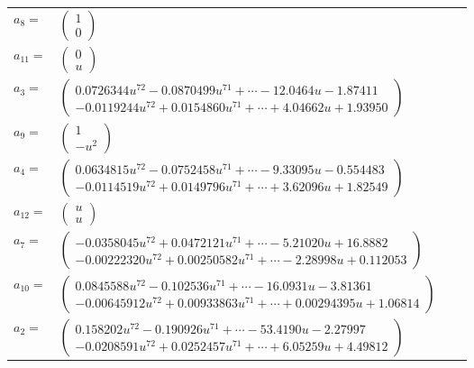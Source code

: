 \documentclass[1p]{elsarticle_modified}
\theoremstyle{definition}
\begin{document}
\begin{tabular}{m{7pt} m{180pt} m{7pt} m{180pt} }
\flushright $a_{8}=$&$\begin{pmatrix}1\\0\end{pmatrix}$ \\
\flushright $a_{11}=$&$\begin{pmatrix}0\\u\end{pmatrix}$ \\
\flushright $a_{3}=$&$\begin{pmatrix}0.0726344 u^{72}-0.0870499 u^{71}+\cdots-12.0464 u-1.87411\\-0.0119244 u^{72}+0.0154860 u^{71}+\cdots+4.04662 u+1.93950\end{pmatrix}$ \\
\flushright $a_{9}=$&$\begin{pmatrix}1\\- u^2\end{pmatrix}$ \\
\flushright $a_{4}=$&$\begin{pmatrix}0.0634815 u^{72}-0.0752458 u^{71}+\cdots-9.33095 u-0.554483\\-0.0114519 u^{72}+0.0149796 u^{71}+\cdots+3.62096 u+1.82549\end{pmatrix}$ \\
\flushright $a_{12}=$&$\begin{pmatrix}u\\u\end{pmatrix}$ \\
\flushright $a_{7}=$&$\begin{pmatrix}-0.0358045 u^{72}+0.0472121 u^{71}+\cdots-5.21020 u+16.8882\\-0.00222320 u^{72}+0.00250582 u^{71}+\cdots-2.28998 u+0.112053\end{pmatrix}$ \\
\flushright $a_{10}=$&$\begin{pmatrix}0.0845588 u^{72}-0.102536 u^{71}+\cdots-16.0931 u-3.81361\\-0.00645912 u^{72}+0.00933863 u^{71}+\cdots+0.00294395 u+1.06814\end{pmatrix}$ \\
\flushright $a_{2}=$&$\begin{pmatrix}0.158202 u^{72}-0.190926 u^{71}+\cdots-53.4190 u-2.27997\\-0.0208591 u^{72}+0.0252457 u^{71}+\cdots+6.05259 u+4.49812\end{pmatrix}$ \\

\end{tabular}
\end{document}
